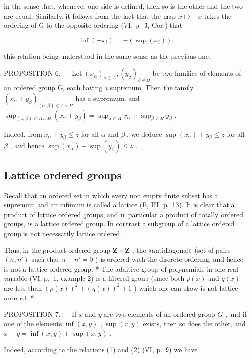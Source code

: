 in the sense that, whenever one side is defined, then so is the other and the two are equal. Similarly, it follows from the fact that the map \(x \mapsto -x\) takes the ordering of G to the opposite ordering (VI, p.~3, Cor.) that

\[
\inf (- x _ {i}) = - (\sup (x _ {i})),\tag{2}
\]

this relation being understood in the same sense as the previous one.

PROPOSITION 6. --- Let \((x_{\alpha})_{\alpha \in A}, (y_{\beta})_{\beta \in B}\) be two families of elements of an ordered group G, each having a supremum. Then the family \((x_{\alpha} + y_{\beta})_{(\alpha, \beta) \in A \times B}\) has a supremum, and \(\sup_{(\alpha, \beta) \in A \times B} (x_{\alpha} + y_{\beta}) = \sup_{\alpha \in A} x_{\alpha} + \sup_{\beta \in B} y_{\beta}\) .

Indeed, from \(x_{\alpha} + y_{\beta} \leqslant z\) for all \(\alpha\) and \(\beta\) , we deduce \(\sup (x_{\alpha}) + y_{\beta} \leqslant z\) for all \(\beta\) , and hence \(\sup (x_{\alpha}) + \sup (y_{\beta}) \leqslant z\) .

\subsection{Lattice ordered groups}

Recall that an ordered set in which every non empty finite subset has a supremum and an infimum is called a lattice (E, III, p.~13). It is clear that a product of lattice ordered groups, and in particular a product of totally ordered groups, is a lattice ordered group. In contrast a subgroup of a lattice ordered group is not necessarily lattice ordered.

Thus, in the product ordered group \(\mathbf{Z} \times \mathbf{Z}\) , the «antidiagonal» (set of pairs \((n, n')\) such that \(n + n' = 0\) ) is ordered with the discrete ordering, and hence is not a lattice ordered group. * The additive group of polynomials in one real variable (VI, p.~1, example 2) is a filtered group (since both \(p(x)\) and \(q(x)\) are less than \((p(x))^2 + (q(x))^2 + 1\) ) which one can show is not lattice ordered. *

PROPOSITION 7. --- If \(x\) and \(y\) are two elements of an ordered group \(G\) , and if one of the elements \(\inf(x, y)\) , \(\sup(x, y)\) exists, then so does the other, and \(x + y = \inf(x, y) + \sup(x, y)\) .

Indeed, according to the relations (1) and (2) (VI, p.~9) we have

